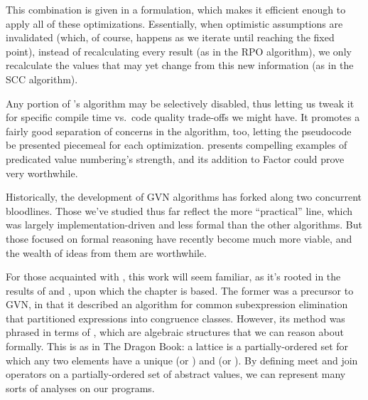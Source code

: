 This combination is given in a  formulation, which makes it
efficient enough to apply all of these optimizations.  Essentially, when
optimistic assumptions are invalidated (which, of course, happens as we iterate
until reaching the fixed point), instead of recalculating every result (as in
the \gls{RPO} algorithm), we only recalculate the values that may yet change
from this new information (as in the \gls{SCC} algorithm).

Any portion of \citeauthor{Gargi}'s algorithm may be selectively disabled, thus
letting us tweak it for specific compile time vs.~code quality trade-offs we
might have.  It promotes a fairly good separation of concerns in the algorithm,
too, letting the pseudocode be presented piecemeal for each optimization.
 presents compelling examples of predicated value numbering's
strength, and its addition to Factor could prove very worthwhile.

Historically, the development of \gls{GVN} algorithms has forked along two
concurrent bloodlines.  Those we've studied thus far reflect the more
``practical'' line, which was largely implementation-driven and less formal
than the other algorithms.  But those focused on formal reasoning have recently
become much more viable, and the wealth of ideas from them are worthwhile.

For those acquainted with \cite[chapter 9 of][(The Dragon Book)]{DragonBook},
this work will seem familiar, as it's rooted in the results of
\citeauthor{Kildall} \autocite*{Kildall} and \citeauthor{Cousot}
\autocite*{Cousot}, upon which the chapter is based.  The former was a
precursor to \gls{GVN}, in that it described an algorithm for common
subexpression elimination that partitioned expressions into congruence classes.
However, its method was phrased in terms of , which are
algebraic structures that we can reason about formally.  This is as in The
Dragon Book: a lattice is a partially-ordered set for which any two elements
have a unique  (or ) and  (or ).  By defining meet and join operators on a
partially-ordered set of abstract values, we can represent many sorts of
analyses on our programs.


